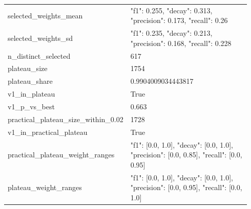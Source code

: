 \begin{longtable}{p{0.281\linewidth}p{0.661\linewidth}}
selected\_\allowbreak{}weights\_\allowbreak{}mean & {"f1": 0.255, "decay": 0.313, "precision": 0.173, "recall": 0.26} \\
selected\_\allowbreak{}weights\_\allowbreak{}sd & {"f1": 0.235, "decay": 0.213, "precision": 0.168, "recall": 0.228} \\
n\_\allowbreak{}distinct\_\allowbreak{}selected & 617 \\
plateau\_\allowbreak{}size & 1754 \\
plateau\_\allowbreak{}share & 0.9904009034443817 \\
v1\_\allowbreak{}in\_\allowbreak{}plateau & True \\
v1\_\allowbreak{}p\_\allowbreak{}vs\_\allowbreak{}best & 0.663 \\
practical\_\allowbreak{}plateau\_\allowbreak{}size\_\allowbreak{}within\_\allowbreak{}0.02 & 1728 \\
v1\_\allowbreak{}in\_\allowbreak{}practical\_\allowbreak{}plateau & True \\
practical\_\allowbreak{}plateau\_\allowbreak{}weight\_\allowbreak{}ranges & {"f1": [0.0, 1.0], "decay": [0.0, 1.0], "precision": [0.0, 0.85], "recall": [0.0, 0.95]} \\
plateau\_\allowbreak{}weight\_\allowbreak{}ranges & {"f1": [0.0, 1.0], "decay": [0.0, 1.0], "precision": [0.0, 0.95], "recall": [0.0, 1.0]} \\
\bottomrule
\end{longtable}
\normalsize
